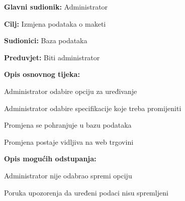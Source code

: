 					
					\noindent {}
					\begin{packed_item}
						
						\item \textbf{Glavni sudionik: } Administrator
						\item  \textbf{Cilj:} Izmjena podataka o maketi
						\item  \textbf{Sudionici:} Baza podataka
						\item  \textbf{Preduvjet:} Biti administrator
						\item  \textbf{Opis osnovnog tijeka:}
						
						\item[] \begin{packed_enum}
							
							\item Administrator odabire opciju za uređivanje
							\item Administrator odabire specifikacije koje treba promijeniti
							\item Promjena se pohranjuje u bazu podataka
							\item Promjena postaje vidljiva na web trgovini
						\end{packed_enum}
						\item  \textbf{Opis mogućih odstupanja:}
						
						\item[] \begin{packed_item}
							
							\item[2.a] Administrator nije odabrao spremi opciju
							
							\item[] \begin{packed_enum}
								
								\item Poruka upozorenja da uređeni podaci nisu spremljeni
								
							\end{packed_enum}
							
						\end{packed_item}
					\end{packed_item}
				
